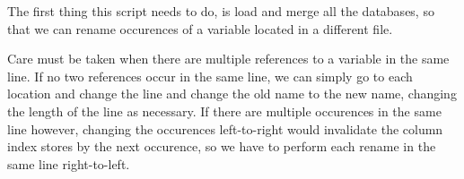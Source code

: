 The first thing this script needs to do, is load and merge all the databases,
so that we can rename occurences of a variable located in a different file.

Care must be taken when there are multiple references to a variable in the same
line. If no two references occur in the same line, we can simply go to each
location and change the line and change the old name to the new name, changing
the length of the line as necessary. If there are multiple occurences in the
same line however, changing the occurences left-to-right would invalidate the
column index stores by the next occurence, so we have to perform each rename in
the same line right-to-left.
